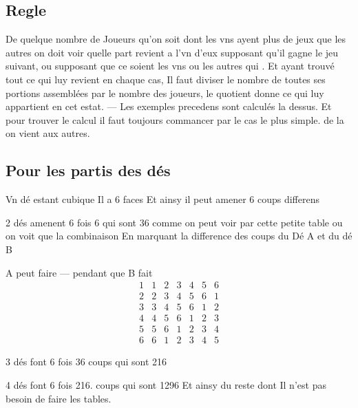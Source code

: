 \documentclass[11pt,a4paper]{article}
\begin{document}
\subsection*{Regle}

De quelque nombre de Joueurs qu'on soit dont les vns ayent plus de jeux que les autres on doit voir quelle part revient a  l'vn d'eux supposant qu'il gagne le jeu suivant, ou supposant que ce soient les vns ou les autres qui . Et ayant trouvé tout ce qui luy revient en chaque cas, Il faut diviser \struck{\ill{}} le nombre de toutes ses portions assemblées par le nombre des joueurs, le quotient donne ce qui luy appartient en cet estat. — Les exemples precedens sont calculés la dessus. Et pour trouver le calcul il faut toujours commancer par le cas le plus simple. de la on vient aux autres.


\subsection*{Pour les partis des dés}

Vn dé estant cubique Il a 6 faces Et ainsy il peut amener 6 coups differens

2 dés amenent 6 fois 6 qui sont 36 comme on peut voir par cette petite table ou on voit que la combinaison En marquant la difference des coups du Dé A et du dé B

A peut faire — pendant que B fait
\[
\begin{array}{c|cccccc}
1 & 1 & 2 & 3 & 4 & 5 & 6 \\
2 & 2 & 3 & 4 & 5 & 6 & 1 \\
3 & 3 & 4 & 5 & 6 & 1 & 2 \\
4 & 4 & 5 & 6 & 1 & 2 & 3 \\
5 & 5 & 6 & 1 & 2 & 3 & 4 \\
6 & 6 & 1 & 2 & 3 & 4 & 5
\end{array}
\]

3 dés font 6 fois 36 coups qui sont 216

4 dés font 6 fois 216. coups qui sont 1296 Et ainsy du reste dont Il n'est pas besoin de faire les tables.
\end{document}

